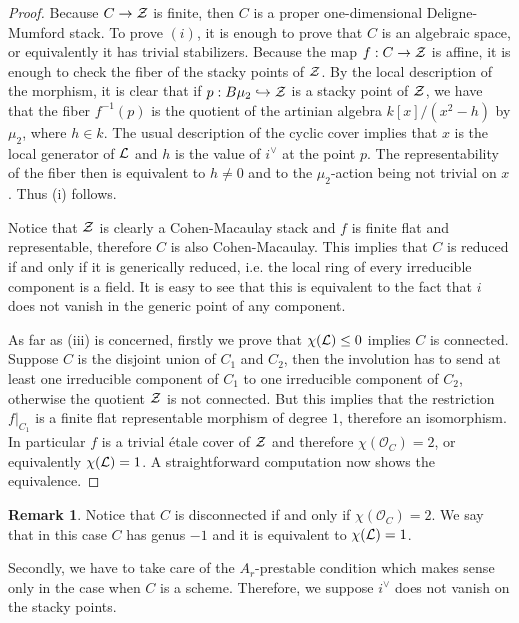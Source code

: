 \documentclass{alggeom}
\numberwithin{equation}{section}
\numberwithin{subsection}{section}
\theoremstyle{definition}
\newtheorem{remark}[theorem]{Remark}
\theoremstyle{remark}
\newcommand\cO{\mathcal{O}} \newcommand\cP{\mathcal{P}}
\begin{document}
\begin{proof}
	 Because $C\rightarrow \mathcal{Z}$ is finite, then $C$ is a proper one-dimensional Deligne-Mumford stack. To prove $(i)$, it is enough to prove that $C$ is an algebraic space, or equivalently it has trivial stabilizers. Because the map $f: C\rightarrow \mathcal{Z}$ is affine, it is enough to check the fiber of the stacky points of $\mathcal{Z}$. By the local description of the morphism, it is clear that if $p:B\mu_2 \hookrightarrow \mathcal{Z}$ is a stacky point of $\mathcal{Z}$, we have that the fiber $f^{-1}(p)$ is the quotient of the artinian algebra $k[x]/(x^2-h)$ by $\mu_2$, where $h \in k$. The usual description of the cyclic cover implies that $x$ is the local generator of $\mathcal{L}$ and $h$ is the value of $i^{\vee}$ at the point $p$. The representability of the fiber then is equivalent to $h\neq 0$ and to the $\mu_2$-action being not trivial on $x$. Thus (i) follows.
	 	
	 Notice that $\mathcal{Z}$ is clearly a Cohen-Macaulay stack and $f$ is finite flat and representable, therefore $C$ is also Cohen-Macaulay. This implies that $C$ is reduced if and only if it is generically reduced, i.e. the local ring of every irreducible component is a field. It is easy to see that this is equivalent to the fact that $i$ does not vanish in the generic point of any component.
	 	
	 As far as (iii) is concerned, firstly we prove that $\chi(\mathcal{L})\leq 0$ implies $C$ is connected. Suppose $C$ is the disjoint union of $C_1$ and $C_2$, then the involution has to send at least one irreducible component of $C_1$ to one irreducible component of $C_2$, otherwise the quotient $\mathcal{Z}$ is not connected. But this implies that the restriction $f\vert_{C_1}$ is a finite flat representable morphism of degree $1$, therefore an isomorphism. In particular $f$ is a trivial \'etale cover of $\mathcal{Z}$ and therefore $\chi(\cO_C)=2$, or equivalently $\chi(\mathcal{L})=1$. A straightforward computation now shows the equivalence.
	 	
\end{proof}
 
 \begin{remark}
 	Notice that $C$ is disconnected if and only if $\chi(\cO_C)=2$. We say that in this case $C$ has genus $-1$ and it is equivalent to $\chi(\mathcal{L})=1$.
 \end{remark}

Secondly, we have to take care of the $A_r$-prestable condition which makes sense only in the case when $C$ is a scheme. Therefore, we suppose $i^{\vee}$ does not vanish on the stacky points.
\end{document}
